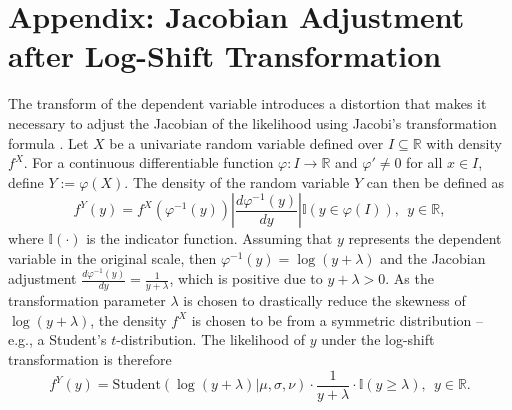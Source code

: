 \chapter{Appendix: Jacobian Adjustment after Log-Shift Transformation}
\label{appendix:jacobian}

The transform of the dependent variable introduces a distortion that makes it necessary to adjust the Jacobian of the likelihood using Jacobi's transformation formula \cite[Theorem 12.6]{jacod_probability_2004}.
Let $X$ be a univariate random variable defined over $I \subseteq \mathbb{R}$ with density $f^X$. For a continuous differentiable function $\varphi: I \rightarrow \mathbb{R}$ and $\varphi' \ne 0$ for all $x \in I$, define $Y := \varphi(X)$.
The density of the random variable $Y$ can then be defined as
\begin{equation*}
    f^Y(y) = f^X(\varphi^{-1}(y))
    \left|\displaystyle \frac{d \varphi^{-1}(y)}{dy}\right|
    \mathbb{I}(y \in \varphi(I)), ~~ y \in \mathbb{R},
\end{equation*}
where $\mathbb{I}(\cdot)$ is the indicator function.
Assuming that $y$ represents the dependent variable in the original scale, then $\varphi^{-1}(y) = \log(y + \lambda)$ and the Jacobian adjustment $\displaystyle \frac{d \varphi^{-1}(y)}{dy} = \frac{1}{y + \lambda}$, which is positive due to $y + \lambda > 0$. As the transformation parameter $\lambda$ is chosen to drastically reduce the skewness of $\log(y + \lambda)$, the density $f^X$ is chosen to be from a symmetric distribution – e.g., a Student's $t$-distribution. The likelihood of $y$ under the log-shift transformation is therefore
\begin{equation*}
    \displaystyle f^Y(y) = \text{Student}(\log(y + \lambda)| \mu , \sigma, \nu)
    \cdot \frac{1}{y + \lambda}
    \cdot\mathbb{I}(y \ge \lambda), ~~ y \in \mathbb{R}.
\end{equation*}
